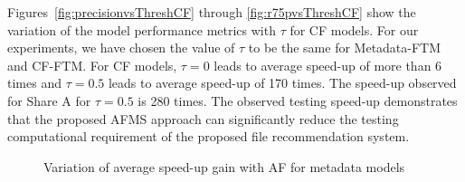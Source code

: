 {Figures~\ref{fig:precisionvsThreshCF} through \ref{fig:r75pvsThreshCF} show the variation of the model performance metrics with $\tau$ for CF models. 
For our experiments, we have chosen the value of $\tau$ to be the same for Metadata-FTM and CF-FTM. %
For CF models, $\tau=0$ leads to average speed-up of more than 6 times and $\tau=0.5$ leads to average speed-up of 170 times. The speed-up observed for Share A for $\tau=0.5$ is 280 times. The observed testing speed-up demonstrates that the proposed AFMS approach can significantly reduce the testing computational requirement of the proposed file recommendation system. 
\vspace{-0.2in}
\begin{figure}[htb!]
\begin{minipage}{.49\textwidth}
\vspace{-0.15in}
\label{fig:precisionvsThreshMeta}
\end{minipage}
\begin{minipage}{.49\textwidth}
\vspace{-0.15in}
\label{fig:recallvsThreshMeta}
\end{minipage}
\begin{minipage}{.49\textwidth}
\vspace{-0.15in}
\label{fig:fscorevsThreshMeta}
\end{minipage}
\begin{minipage}{.49\textwidth}
\vspace{-0.15in}
\label{fig:r75pvsThreshMeta}
\end{minipage}
\vspace{-0.4in}
\end{figure}

\begin{figure}[!htb]
\centering
{}
\vspace{-0.1in}
\caption{Variation of average speed-up gain with AF for metadata models } 
\label{fig:gainvsfscoreMeta}
\end{figure}

}
